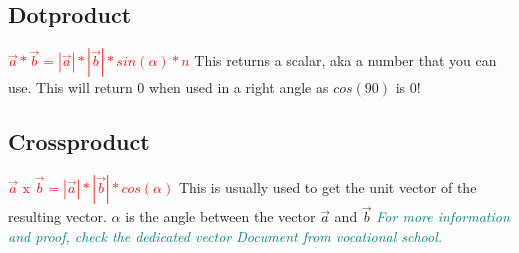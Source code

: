 \documentclass[main.tex,fontsize=8pt,paper=a4,paper=portrait,DIV=calc,]{scrartcl}
\begin{document}
\subsection{Dotproduct}
\Large{\textbf{\textcolor{red}{\( \vec{a} * \vec{b} = |\vec{a}| * |\vec{b}| * sin(\alpha) * n \)}}}\newline
\normalsize This returns a scalar, aka a number that you can use.\newline
This will return 0 when used in a right angle as \(cos(90)\) is 0!\\
\subsection{Crossproduct}
\Large{\textbf{\textcolor{red}{\( \vec{a} \text{ x } \vec{b} = |\vec{a}| * |\vec{b}| * cos(\alpha) \)}}}\newline
\normalsize This is usually used to get the unit vector of the resulting vector.\newline
\(\alpha\) is the angle between the vector \(\vec{a}\) and \(\vec{b}\)\newline
\emph{\textcolor{teal}{For more information and proof, check the dedicated vector Document from vocational school.}}\\
\pagebreak
\end{document}
